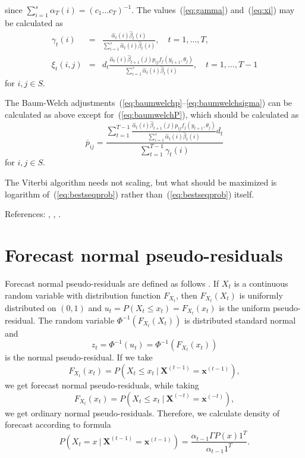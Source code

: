 \documentclass[a4paper,11pt]{article}
\renewcommand{\Pr}{\mathit{P}}
\begin{document}
since $\sum_{i = 1}^s \alpha_T(i) = (c_1 \ldots c_T)^{-1}$.
The values~(\ref{eq:gamma}) and~(\ref{eq:xi}) may be calculated as
\begin{eqnarray}
  \label{eq:gammabyscaled}
  \gamma_t(i) & = & \frac{\hat{\alpha}_t(i)\hat{\beta}_t(i)}{\sum_{i =
      1}^s \hat{\alpha}_t(i) \hat{\beta}_t(i)}, \hspace{1em} t = 1,
  \ldots, T, \\
  \label{eq:xibyscaled}
  \xi_t(i, j) & = & d_t\frac{\hat{\alpha}_t(i)\hat{\beta}_{t +
      1}(j)p_{ij} f_j(y_{t + 1}, \theta_j)}{\sum_{i = 1}^s
    \hat{\alpha}_t(i) \hat{\beta}_t(i)},
  \hspace{1em} t = 1, \ldots, T - 1
\end{eqnarray}
for $i, j \in S$.

The Baum-Welch
adjustments~(\ref{eq:baumwelchp}--\ref{eq:baumwelchsigma}) can be
calculated as above except for~(\ref{eq:baumwelchP}), which should be
calculated as
\begin{equation}
  \label{eq:baumwelchPscaled}
  \overline{p}_{ij} = \frac{\sum_{t = 1}^{T - 1} \frac{\hat{\alpha}_t(i)
      \hat{\beta}_{t + 1}(j) p_{ij} f_j(y_{t + 1}, \theta_j)}{\sum_{i =
        1}^s \hat{\alpha}_t(i) \hat{\beta}_t(i)}d_t }{\sum_{t = 1}^{T - 1}
    \gamma_t(i)}
\end{equation}
for $i, j \in S$.

The Viterbi algorithm needs not scaling, but what should be maximized
is logarithm of~(\ref{eq:bestseqprob}) rather
than~(\ref{eq:bestseqprob}) itself.

References: \cite{rabiner-1989}, \cite{baum-petrie-soules-weiss-1970},
\cite{cappe-moulines-ryden-2005}.

\section{Forecast normal pseudo-residuals}

Forecast normal pseudo-residuals are defined as follows \cite [p.~97]
{zucchini-macdonald-2009}. If $X_t$ is a continuous random variable
with distribution function $F_{X_t}$, then $F_{X_t}(X_t)$ is uniformly
distributed on $(0, 1)$ and $u_t = \Pr(X_t \leq x_t) = F_{X_t}(x_t)$
is the uniform pseudo-residual. The random variable
$\Phi^{-1}(F_{X_t}(X_t))$ is distributed standard normal and
\[
z_t = \Phi^{-1}(u_t) = \Phi^{-1}(F_{X_t}(x_t))
\]
is the normal pseudo-residual. If we take
\[
F_{X_t}(x_t) = \Pr(X_t \leq x_t\ |\ \mathbf{X}^{(t - 1)} =
\mathbf{x}^{(t - 1)}),
\]
we get forecast normal pseudo-residuals, while taking
\[
F_{X_t}(x_t) = \Pr(X_t \leq x_t\ |\ \mathbf{X}^{(-t)} =
\mathbf{x}^{(-t)}),
\]
we get ordinary normal pseudo-residuals. Therefore, we calculate
density of forecast according to formula
\[
\Pr(X_t = x\ |\ \mathbf{X}^{(t - 1)} = \mathbf{x}^{(t - 1)})
= \frac{\alpha_{t - 1} \Gamma P(x) 1^T}{\alpha_{t - 1} 1^T}.
\]



\end{document}
